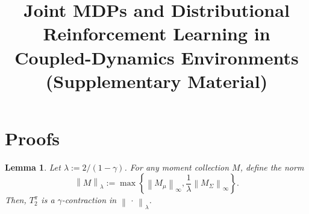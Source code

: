 \documentclass[accepted]{uai2026}
\theoremstyle{plain}
\newtheorem{lemma}[theorem]{Lemma}
\theoremstyle{definition}
\theoremstyle{remark}
\newcommand{\1}{\mathbbm{1}}
\newcommand{\norm}[1]{\left\lVert #1\right\rVert}
\begin{document}
\newpage

\onecolumn

\title{Joint MDPs and Distributional Reinforcement Learning in Coupled-Dynamics Environments\\(Supplementary Material)}
\maketitle
\appendix
\section{Proofs}\label{app:proofs}
\begin{lemma}
Let $\lambda := 2/(1-\gamma)$. For any moment collection $M$, define the norm
\begin{equation}
\norm{M}_{\lambda} := \max \left\{\norm{M_\mu}_\infty, \frac{1}{\lambda}\norm{M_\Sigma}_\infty \right\}.
\end{equation}
Then, $T^\pi_2$ is a $\gamma$-contraction in $\norm{\,\cdot\,}_{\lambda}$.
\end{lemma}
\end{document}
